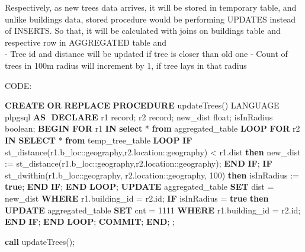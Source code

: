\documentclass[11pt]{article}
\newenvironment{Shaded}{}{}
\newcommand{\KeywordTok}[1]{\textcolor[rgb]{0.00,0.44,0.13}{\textbf{{#1}}}}
\newcommand{\DataTypeTok}[1]{\textcolor[rgb]{0.56,0.13,0.00}{{#1}}}
\newcommand{\DecValTok}[1]{\textcolor[rgb]{0.25,0.63,0.44}{{#1}}}
\newcommand{\CharTok}[1]{\textcolor[rgb]{0.25,0.44,0.63}{{#1}}}
\newcommand{\NormalTok}[1]{{#1}}
\begin{document}
    Respectively, as new trees data arrives, it will be stored in temporary
table, and unlike buildings data, stored procedure would be performing
UPDATES instead of INSERTS. So that, it will be calculated with joins on
buildings table and respective row in AGGREGATED table and\\
- Tree id and distance will be updated if tree is closer than old one -
Count of trees in 100m radius will increment by 1, if tree lays in that
radius

CODE:

    \begin{Shaded}
\begin{Highlighting}[]
\KeywordTok{CREATE} \KeywordTok{OR} \KeywordTok{REPLACE} \KeywordTok{PROCEDURE}\NormalTok{ updateTrees()}
\NormalTok{LANGUAGE plpgsql}
\KeywordTok{AS}\NormalTok{ $$}
\KeywordTok{DECLARE}
\NormalTok{    r1 }\DataTypeTok{record}\NormalTok{;}
\NormalTok{    r2 }\DataTypeTok{record}\NormalTok{;}
\NormalTok{    new_dist }\DataTypeTok{float}\NormalTok{;}
\NormalTok{    isInRadius }\DataTypeTok{boolean}\NormalTok{;}
\KeywordTok{BEGIN}
    \KeywordTok{FOR}\NormalTok{ r1 }\KeywordTok{IN} \KeywordTok{select}\NormalTok{ * }\KeywordTok{from}\NormalTok{ aggregated_table}
    \KeywordTok{LOOP}
        \KeywordTok{FOR}\NormalTok{ r2 }\KeywordTok{IN} \KeywordTok{SELECT}\NormalTok{ * }\KeywordTok{from}\NormalTok{ temp_tree_table}
        \KeywordTok{LOOP}
            \KeywordTok{IF}\NormalTok{ st_distance(r1.b_loc:}\CharTok{:geography}\NormalTok{,r2.location:}\CharTok{:geography}\NormalTok{) < r1.dist }\KeywordTok{then}
\NormalTok{                new_dist := st_distance(r1.b_loc:}\CharTok{:geography}\NormalTok{,r2.location:}\CharTok{:geography}\NormalTok{);                }
            \KeywordTok{END} \KeywordTok{IF}\NormalTok{;}
            \KeywordTok{IF}\NormalTok{ st_dwithin(r1.b_loc:}\CharTok{:geography}\NormalTok{, r2.location:}\CharTok{:geography}\NormalTok{, }\DecValTok{100}\NormalTok{) }\KeywordTok{then}
\NormalTok{                isInRadius := }\KeywordTok{true}\NormalTok{;}
            \KeywordTok{END} \KeywordTok{IF}\NormalTok{;}
        \KeywordTok{END} \KeywordTok{LOOP}\NormalTok{;}
        \KeywordTok{UPDATE}\NormalTok{ aggregated_table }
        \KeywordTok{SET}\NormalTok{ dist = new_dist }
        \KeywordTok{WHERE}\NormalTok{ r1.building_id = r2.id;}
        \KeywordTok{IF}\NormalTok{ isInRadius = }\KeywordTok{true} \KeywordTok{then}
            \KeywordTok{UPDATE}\NormalTok{ aggregated_table }
            \KeywordTok{SET}\NormalTok{ cnt = }\DecValTok{1111} 
            \KeywordTok{WHERE}\NormalTok{ r1.building_id = r2.id;}
        \KeywordTok{END} \KeywordTok{IF}\NormalTok{;}
    \KeywordTok{END} \KeywordTok{LOOP}\NormalTok{;}
    \KeywordTok{COMMIT}\NormalTok{;}
\KeywordTok{END}\NormalTok{;}
\NormalTok{$$;}

\KeywordTok{call}\NormalTok{ updateTrees();}
\end{Highlighting}
\end{Shaded}
\end{document}

